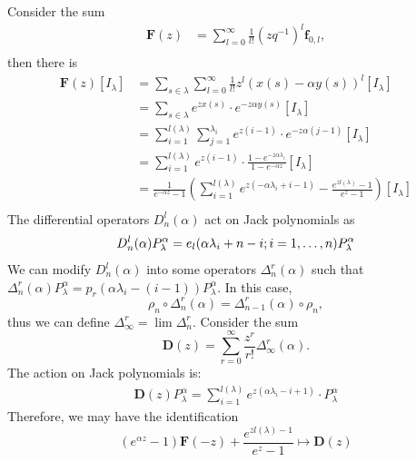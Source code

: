 \documentclass{article}
\begin{document}
Consider the sum
\[
\begin{aligned}
\mathbf{F}(z) &= \sum_{l=0}^\infty \frac{1}{l!}(zq^{-1})^l\mathbf{f}_{0,l},\\
\end{aligned}
\]
then there is 
\[
\begin{aligned}
\mathbf{F}(z)[I_\lambda] &= \sum_{s\in\lambda}\sum_{l=0}^\infty \frac{1}{l!}z^{l}(x(s)-\alpha y(s))^l[I_\lambda]\\
&= \sum_{s\in\lambda}e^{zx(s)}\cdot e^{-z\alpha y(s)} [I_\lambda]\\
&= \sum_{i=1}^{l(\lambda)} \sum_{j=1}^{\lambda_i}e^{z(i-1)}\cdot e^{-z\alpha (j-1)} [I_\lambda]\\
&= \sum_{i=1}^{l(\lambda)} e^{z(i-1)}\cdot\frac{1-e^{-z\alpha\lambda_i}}{1-e^{-\alpha z}} [I_\lambda]\\
&= \frac{1}{e^{-\alpha z}-1}\left(\sum_{i=1}^{l(\lambda)} e^{z(-\alpha\lambda_i+i-1)} - \frac{e^{zl(\lambda)}-1}{e^z-1}\right)[I_\lambda]\\
\end{aligned}
\]
The differential operators $D_n^l(\alpha)$ act on Jack polynomials as \[D_n^l(\alpha)P_\lambda^\alpha = e_l(\alpha\lambda_i+n-i; i=1,\ldots,n)P_\lambda^\alpha\\\]
We can modify $D_n^l(\alpha)$ into some operators $\Delta_n^r(\alpha)$ such that $\Delta_n^r(\alpha) P_\lambda^\alpha = p_r(\alpha\lambda_i - (i-1))P_\lambda^\alpha$.
In this case, 
\[\rho_n\circ\Delta_n^r(\alpha) = \Delta_{n-1}^r(\alpha)\circ\rho_n,\]
thus we can define $\Delta_\infty^r = \lim\Delta_n^r$. Consider the sum
\[\mathbf{D}(z) = \sum_{r=0}^\infty \frac{z^r}{r!}\Delta_\infty^r(\alpha).\]
The action on Jack polynomials is:
\[
\begin{aligned}
\mathbf{D}(z)P_\lambda^\alpha = \sum_{i=1}^{l(\lambda)}e^{z(\alpha\lambda_i-i+1)}\cdot P_\lambda^\alpha
\end{aligned}
\]
Therefore, we may have the identification
\[(e^{\alpha z}-1)\mathbf{F}(-z)+\frac{e^{zl(\lambda)-1}}{e^z-1}\mapsto \mathbf{D}(z)\]
\end{document}
